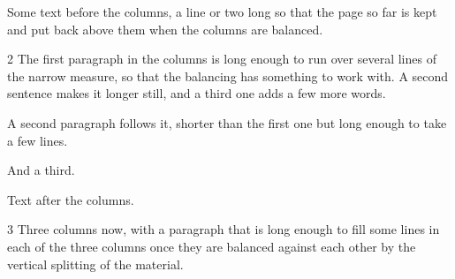 \documentclass{article}
\begin{document}
Some text before the columns, a line or two long so that the page so far is kept and put back above them when the
columns are balanced.

\begin{multicols}{2}
The first paragraph in the columns is long enough to run over several lines of the narrow measure, so that the
balancing has something to work with. A second sentence makes it longer still, and a third one adds a few more words.

A second paragraph follows it, shorter than the first one but long enough to take a few lines.

And a third.
\end{multicols}
Text after the columns.

\begin{multicols}{3}
Three columns now, with a paragraph that is long enough to fill some lines in each of the three columns once they are
balanced against each other by the vertical splitting of the material.
\end{multicols}
\end{document}
